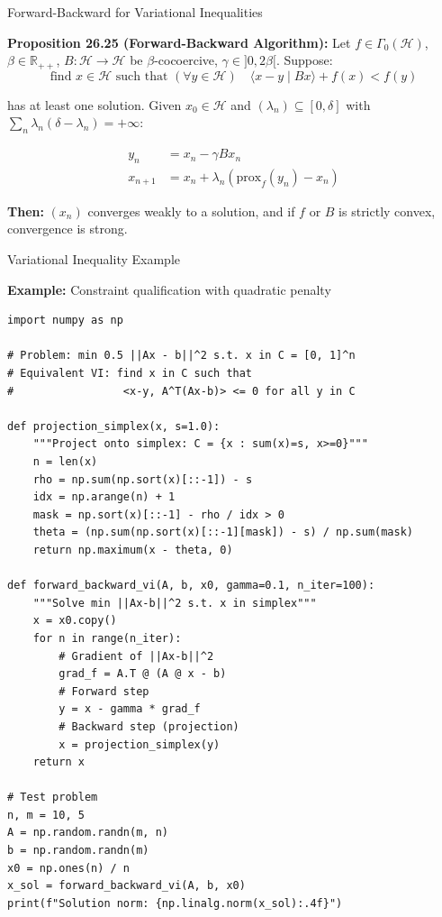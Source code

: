 \documentclass[aspectratio=169,10pt]{beamer}
\begin{document}
\begin{frame}{Forward-Backward for Variational Inequalities}

\textbf{Proposition 26.25 (Forward-Backward Algorithm):} Let $f \in \Gamma_0(\mathcal{H})$, $\beta \in \mathbb{R}_{++}$, $B: \mathcal{H} \to \mathcal{H}$ be $\beta$-cocoercive, $\gamma \in ]0, 2\beta[$. Suppose:
\[ \text{find } x \in \mathcal{H} \text{ such that } (\forall y \in \mathcal{H}) \quad \langle x - y \mid Bx \rangle + f(x) < f(y) \]

has at least one solution. Given $x_0 \in \mathcal{H}$ and $(\lambda_n) \subseteq [0, \delta]$ with $\sum_n \lambda_n(\delta - \lambda_n) = +\infty$:

\begin{align*}
  y_n &= x_n - \gamma B x_n \\
  x_{n+1} &= x_n + \lambda_n(\text{prox}_f(y_n) - x_n)
\end{align*}

\textbf{Then:} $(x_n)$ converges weakly to a solution, and if $f$ or $B$ is strictly convex, convergence is strong.

\end{frame}

\begin{frame}[fragile]{Variational Inequality Example}

\textbf{Example:} Constraint qualification with quadratic penalty

\vspace{0.2cm}
\lstset{basicstyle=\ttfamily\footnotesize}
\begin{lstlisting}
import numpy as np

# Problem: min 0.5 ||Ax - b||^2 s.t. x in C = [0, 1]^n
# Equivalent VI: find x in C such that
#                 <x-y, A^T(Ax-b)> <= 0 for all y in C

def projection_simplex(x, s=1.0):
    """Project onto simplex: C = {x : sum(x)=s, x>=0}"""
    n = len(x)
    rho = np.sum(np.sort(x)[::-1]) - s
    idx = np.arange(n) + 1
    mask = np.sort(x)[::-1] - rho / idx > 0
    theta = (np.sum(np.sort(x)[::-1][mask]) - s) / np.sum(mask)
    return np.maximum(x - theta, 0)

def forward_backward_vi(A, b, x0, gamma=0.1, n_iter=100):
    """Solve min ||Ax-b||^2 s.t. x in simplex"""
    x = x0.copy()
    for n in range(n_iter):
        # Gradient of ||Ax-b||^2
        grad_f = A.T @ (A @ x - b)
        # Forward step
        y = x - gamma * grad_f
        # Backward step (projection)
        x = projection_simplex(y)
    return x

# Test problem
n, m = 10, 5
A = np.random.randn(m, n)
b = np.random.randn(m)
x0 = np.ones(n) / n
x_sol = forward_backward_vi(A, b, x0)
print(f"Solution norm: {np.linalg.norm(x_sol):.4f}")
\end{lstlisting}

\end{frame}
\end{document}
